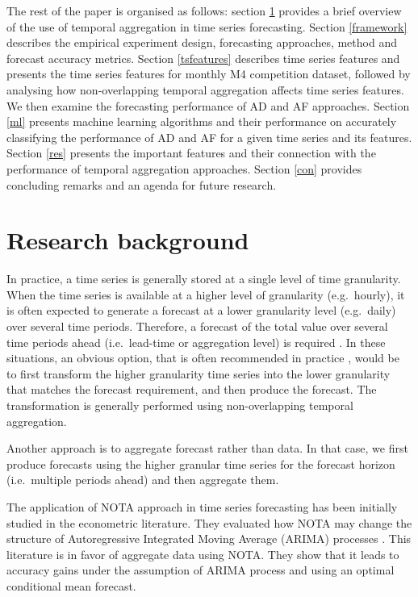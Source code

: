 \documentclass[preprint, 3p,
authoryear]{elsarticle} %
\begin{document}
The rest of the paper is organised as follows: section \ref{lit}
provides a brief overview of the use of temporal aggregation in time
series forecasting. Section \ref{framework} describes the empirical
experiment design, forecasting approaches, method and forecast accuracy
metrics. Section \ref{tsfeatures} describes time series features and
presents the time series features for monthly M4 competition dataset,
followed by analysing how non-overlapping temporal aggregation affects
time series features. We then examine the forecasting performance of AD
and AF approaches. Section \ref{ml} presents machine learning algorithms
and their performance on accurately classifying the performance of AD
and AF for a given time series and its features. Section \ref{res}
presents the important features and their connection with the
performance of temporal aggregation approaches. Section \ref{con}
provides concluding remarks and an agenda for future research.

\hypertarget{lit}{%
\section{Research background}\label{lit}}

In practice, a time series is generally stored at a single level of time
granularity. When the time series is available at a higher level of
granularity (e.g.~hourly), it is often expected to generate a forecast
at a lower granularity level (e.g.~daily) over several time periods.
Therefore, a forecast of the total value over several time periods ahead
(i.e.~lead-time or aggregation level) is required
\citep{mohammadipour2012forecast}. In these situations, an obvious
option, that is often recommended in practice \citep{goodwin2018profit},
would be to first transform the higher granularity time series into the
lower granularity that matches the forecast requirement, and then
produce the forecast. The transformation is generally performed using
non-overlapping temporal aggregation.

Another approach is to aggregate forecast rather than data. In that
case, we first produce forecasts using the higher granular time series
for the forecast horizon (i.e.~multiple periods ahead) and then
aggregate them.

The application of NOTA approach in time series forecasting has been
initially studied in the econometric literature. They evaluated how NOTA
may change the structure of Autoregressive Integrated Moving Average
(ARIMA) processes \citep{wei1978some, rossana1995temporal}. This
literature is in favor of aggregate data using NOTA. They show that it
leads to accuracy gains under the assumption of ARIMA process and using
an optimal conditional mean forecast.
\end{document}
